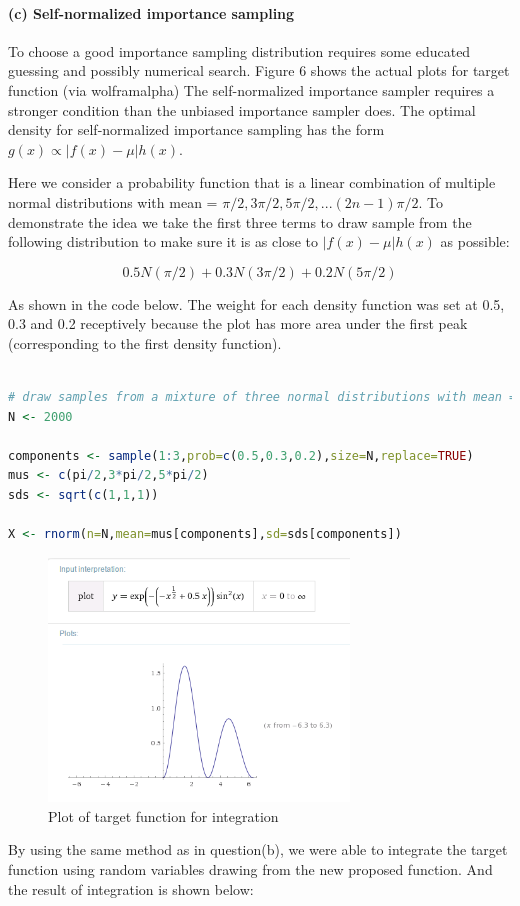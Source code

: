 \documentclass[10pt, letterpaper]{proc}
\begin{document}
\paragraph{(c) Self-normalized importance sampling} To choose a good importance sampling distribution requires some educated
guessing and possibly numerical search. Figure 6 shows the actual plots for target function (via wolframalpha) The self-normalized importance sampler requires a stronger condition than the unbiased importance sampler does. The optimal density for self-normalized importance sampling has the form $g(x) \propto |f(x)-\mu|h(x)$.

Here we consider a probability function that is a linear combination of multiple normal distributions with mean = $\pi/2, 3\pi/2, 5\pi/2, ... (2n-1)\pi/2.$ To demonstrate the idea we take the first three terms to draw sample from the following distribution to make sure it is as close to $|f(x)-\mu|h(x)$ as possible:

$$ 0.5 N(\pi/2) + 0.3 N(3\pi/2) + 0.2 N(5\pi/2) $$

As shown in the code below. The weight for each density function was set at 0.5, 0.3 and 0.2 receptively because the plot has more area under the first peak (corresponding to the first density function).

\begin{lstlisting}[language=R, breaklines=T, basicstyle=\footnotesize\ttfamily]

# draw samples from a mixture of three normal distributions with mean = (pi/2,3*pi/2,5*pi/2) weight = (0.5,0.3,0.2) and variance = sqrt(c(1,1,1)).
N <- 2000

components <- sample(1:3,prob=c(0.5,0.3,0.2),size=N,replace=TRUE)
mus <- c(pi/2,3*pi/2,5*pi/2)
sds <- sqrt(c(1,1,1))

X <- rnorm(n=N,mean=mus[components],sd=sds[components])
\end{lstlisting}

\begin{figure}
	\centering \includegraphics[width=8cm]{function}
	\caption{Plot of target function for integration}
\end{figure}
By using the same method as in question(b), we were able to integrate the target function using random variables drawing from the new proposed function. And the result of integration is shown below:
\end{document}
